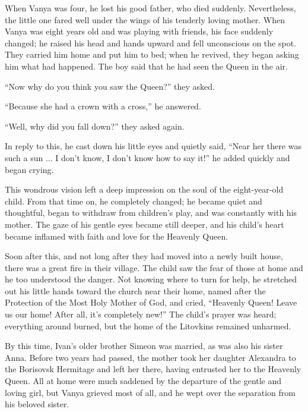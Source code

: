 When Vanya was four, he lost his good father, who died suddenly. Nevertheless, the little one fared well under the wings of his tenderly loving mother. When Vanya was eight years old and was playing with friends, his face suddenly changed; he raised his head and hands upward and fell unconscious on the spot. They carried him home and put him to bed; when he revived, they began asking him what had happened. The boy said that he had seen the Queen in the air.

``Now why do you think you saw the Queen?'' they asked.

``Because she had a crown with a cross,'' he answered.

``Well, why did you fall down?'' they asked again.

In reply to this, he cast down his little eyes and quietly said, ``Near her there was such a sun ... I don't know, I don't know how to say it!'' he added quickly and began crying.

This wondrous vision left a deep impression on the soul of the eight-year-old child. From that time on, he completely changed; he became quiet and thoughtful, began to withdraw from children's play, and was constantly with his mother. The gaze of his gentle eyes became still deeper, and his child's heart became inflamed with faith and love for the Heavenly Queen.

Soon after this, and not long after they had moved into a newly built house, there was a great fire in their village. The child saw the fear of those at home and he too understood the danger. Not knowing where to turn for help, he stretched out his little hands toward the church near their home, named after the Protection of the Most Holy Mother of God, and cried, ``Heavenly Queen! Leave us our home! After all, it's completely new!'' The child's prayer was heard; everything around burned, but the home of the Litovkins remained unharmed.

By this time, Ivan's older brother Simeon was married, as was also his sister Anna. Before two years had passed, the mother took her daughter Alexandra to the Borisovsk Hermitage and left her there, having entrusted her to the Heavenly Queen. All at home were much saddened by the departure of the gentle and loving girl, but Vanya grieved most of all, and he wept over the separation from his beloved sister.

